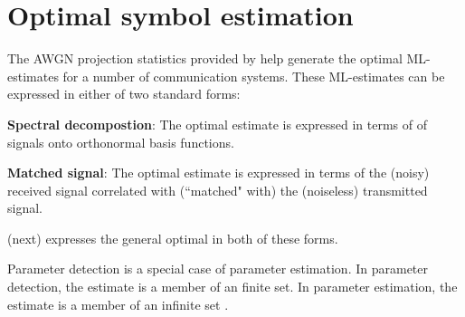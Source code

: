 
\section{Optimal symbol estimation}
\label{sec:awgn_est}
The AWGN projection statistics provided by
 help generate the optimal
ML-estimates for a number of communication systems.
These ML-estimates can be expressed in either of two standard forms:
\begin{liste}
  \item {\bf Spectral decompostion}:
     The optimal estimate is expressed in terms of 
     of signals onto orthonormal basis functions.
  \item {\bf Matched signal}:
     The optimal estimate is expressed in terms of the (noisy)
     received signal correlated with (``matched" with)
     the (noiseless) transmitted signal.
\end{liste}
 (next) expresses the general
optimal  in both of these forms.

Parameter detection is a special case of parameter estimation.
In parameter detection, the estimate is a member of an finite set.
In parameter estimation, the estimate is a member of an infinite set
.

